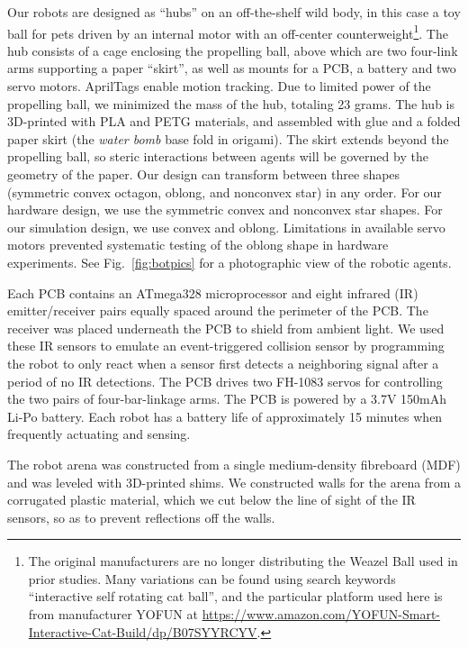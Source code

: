 \documentclass[runningheads]{llncs}
\begin{document}
Our robots are designed as ``hubs'' on an off-the-shelf wild body, in this case a toy ball for pets driven by an internal motor with an off-center counterweight\footnote{The original manufacturers are no longer distributing the Weazel Ball used in prior studies. Many variations can be found using search keywords ``interactive self rotating cat ball'', and the particular platform used here is from manufacturer YOFUN at \url{https://www.amazon.com/YOFUN-Smart-Interactive-Cat-Build/dp/B07SYYRCYV}.}. The hub consists of a cage enclosing the propelling ball, above which are two four-link arms supporting a paper ``skirt'', as well as mounts for a PCB, a battery and two servo motors. AprilTags \cite{wang2016iros} enable motion tracking. Due to limited power of the propelling ball, we minimized the mass of the hub, totaling 23 grams. The hub is 3D-printed with PLA and PETG materials, and assembled with glue and a folded paper skirt (the \emph{water bomb} base fold in origami). The skirt extends beyond the propelling ball, so steric interactions between agents will be governed by the geometry of the paper. Our design can transform between three shapes (symmetric convex octagon, oblong, and nonconvex star) in any order. For our hardware design, we use the symmetric convex and nonconvex star shapes. For our simulation design, we use convex and oblong. Limitations in available servo motors prevented systematic testing of the oblong shape in hardware experiments. See Fig.~\ref{fig:botpics} for a photographic view of the robotic agents.

Each PCB contains an ATmega328 microprocessor and eight infrared (IR) emitter/receiver pairs equally spaced around the perimeter of the PCB. The receiver was placed underneath the PCB to shield from ambient light. We used these IR sensors to emulate an event-triggered collision sensor by programming the robot to only react when a sensor first detects a neighboring signal after a period of no IR detections.  The PCB drives two FH-1083 servos for controlling the two pairs of four-bar-linkage arms. The PCB is powered by a 3.7V 150mAh Li-Po battery. Each robot has a battery life of approximately 15 minutes when frequently actuating and sensing.

The robot arena was constructed from a single medium-density fibreboard (MDF) and was leveled with 3D-printed shims. We constructed walls for the arena from a corrugated plastic material, which we cut below the line of sight of the IR sensors, so as to prevent reflections off the walls.
\end{document}

